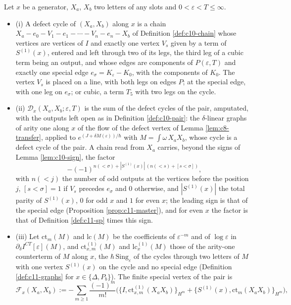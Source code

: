 \begin{definition}
\label{def:c11-defect}
Let $x$ be a generator, $X_a$, $X_b$ two letters of any slots and $0<\varepsilon<T\le\infty$.
\begin{itemize}
\item (i) A defect cycle of $(X_a,X_b)$ along $x$ is a chain $X_a-e_0-V_1-e_1-\cdots-V_n-e_n-X_b$ of Definition \ref{def:c10-chain} whose vertices are vertices of $I$ and exactly one vertex $V_s$ given by a term of $S^{(1)}(x)$, entered and left through two of its legs, the third leg of a cubic term being an output, and whose edges are components of $P(\varepsilon,T)$ and exactly one special edge $e_\sigma=K_\varepsilon-K_0$, with the components of $K_0$. The vertex $V_s$ is placed on a line, with both legs on edges $P$; at the special edge, with one leg on $e_\sigma$; or cubic, a term $T_5$ with two legs on the cycle.
\item (ii) $\mathcal D_x(X_a,X_b;\varepsilon,T)$ is the sum of the defect cycles of the pair, amputated, with the outputs left open as in Definition \ref{def:c10-pair}: the $\delta$-linear graphs of arity one along $x$ of the flow of the defect vertex of Lemma \ref{lem:c8-transfer}, applied to $e^{(J+\delta M(\varepsilon))/\hbar}$ with $M=\int\omega\,X_aX_b$, whose cycle is a defect cycle of the pair. A chain read from $X_a$ carries, beyond the signs of Lemma \ref{lem:c10-sign}, the factor
\[
-(-1)^{n(<\sigma)+|S^{(1)}(x)|\,(n(<s)+[s<\sigma])},
\]
with $n(<j)$ the number of odd outputs at the vertices before the position $j$, $[s<\sigma]=1$ if $V_s$ precedes $e_\sigma$ and $0$ otherwise, and $|S^{(1)}(x)|$ the total parity of $S^{(1)}(x)$, $0$ for odd $x$ and $1$ for even $x$; the leading sign is that of the special edge (Proposition \ref{prop:c11-master}), and for even $x$ the factor is that of Definition \ref{def:c11-sp} times this sign.
\item (iii) Let $\mathrm{ct}_m(M)$ and $\mathrm{lc}(M)$ be the coefficients of $\varepsilon^{-m}$ and of $\log\varepsilon$ in $\partial_\delta I^{CT}[\varepsilon](M)$, and $\mathrm{ct}^{(1)}_{x,m}(M)$ and $\mathrm{lc}^{(1)}_x(M)$ those of the arity-one counterterm of $M$ along $x$, the $\hbar\,\mathrm{Sing}_\varepsilon$ of the cycles through two letters of $M$ with one vertex $S^{(1)}(x)$ on the cycle and no special edge (Definition \ref{def:c11-graphs} for $x\in\{\Delta,P_b\}$). The finite special vertex of the pair is
\[
\mathcal F_x(X_a,X_b):=-\sum_{m\ge1}\frac{(-1)^m}{m!}\Big(\big\{I,\mathrm{ct}^{(1)}_{x,m}(X_aX_b)\big\}_{H^m}+\big\{S^{(1)}(x),\mathrm{ct}_m(X_aX_b)\big\}_{H^m}\Big),
\]
\end{itemize}
\end{definition}
